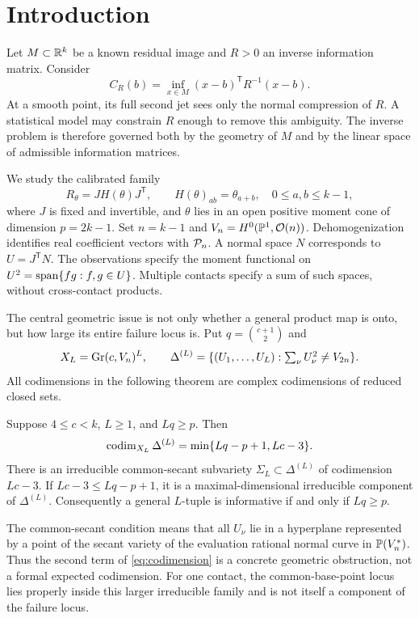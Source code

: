 \section{Introduction}
Let $M\subset\mathbb R^k$ be a known residual image and $R>0$ an inverse information matrix. Consider
\begin{equation}\label{eq:distance}
 C_R(b)=\inf_{x\in M}(x-b)^{\mathsf T}R^{-1}(x-b).
\end{equation}
At a smooth point, its full second jet sees only the normal compression of $R$. A statistical model may constrain $R$ enough to remove this ambiguity. The inverse problem is therefore governed both by the geometry of $M$ and by the linear space of admissible information matrices.

We study the calibrated family
\[
 R_\theta=JH(\theta)J^{\mathsf T},\qquad
 H(\theta)_{ab}=\theta_{a+b},\quad 0\le a,b\le k-1,
\]
where $J$ is fixed and invertible, and $\theta$ lies in an open positive moment cone of dimension $p=2k-1$. Set $n=k-1$ and $V_n=H^0(\mathbb P^1,\mathcal O(n))$. Dehomogenization identifies real coefficient vectors with $\mathcal P_n$. A normal space $N$ corresponds to $U=J^{\mathsf T}N$. The observations specify the moment functional on $U^2=\operatorname{span}\{fg:f,g\in U\}$. Multiple contacts specify a sum of such spaces, without cross-contact products.

The central geometric issue is not only whether a general product map is onto, but how large its entire failure locus is. Put $q=\binom{c+1}{2}$ and
\[
 X_L=\operatorname{Gr}(c,V_n)^L,\qquad
 \Delta^{(L)}=\{(U_1,\ldots,U_L):\textstyle\sum_\nu U_\nu^2\ne V_{2n}\}.
\]
All codimensions in the following theorem are complex codimensions of reduced closed sets.
\begin{theorem}\label{thm:global-intro}
Suppose $4\le c<k$, $L\ge1$, and $Lq\ge p$. Then
\begin{equation}\label{eq:codimension}
 \operatorname{codim}_{X_L}\Delta^{(L)}=\min\{Lq-p+1,Lc-3\}.
\end{equation}
There is an irreducible common-secant subvariety $\Sigma_L\subset\Delta^{(L)}$ of codimension $Lc-3$. If $Lc-3\le Lq-p+1$, it is a maximal-dimensional irreducible component of $\Delta^{(L)}$. Consequently a general $L$-tuple is informative if and only if $Lq\ge p$.
\end{theorem}
The common-secant condition means that all $U_\nu$ lie in a hyperplane represented by a point of the secant variety of the evaluation rational normal curve in $\mathbb P(V_n^*)$. Thus the second term of \eqref{eq:codimension} is a concrete geometric obstruction, not a formal expected codimension. For one contact, the common-base-point locus lies properly inside this larger irreducible family and is not itself a component of the failure locus.

